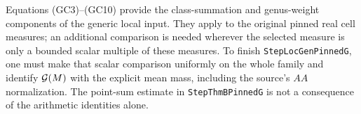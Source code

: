 Equations (GC3)--(GC10) provide the class-summation
and genus-weight components of the generic local input.
They apply to the original pinned real cell measures;
an additional comparison is needed wherever the selected
measure is only a bounded scalar multiple of these
measures. To finish \texttt{StepLocGenPinnedG}, one must
make that scalar comparison uniformly on the whole
family and identify \({\cal G}(M)\) with the explicit
mean mass, including the source's \(AA\) normalization.
The point-sum estimate in \texttt{StepThmBPinnedG}
is not a consequence of the arithmetic identities alone.
